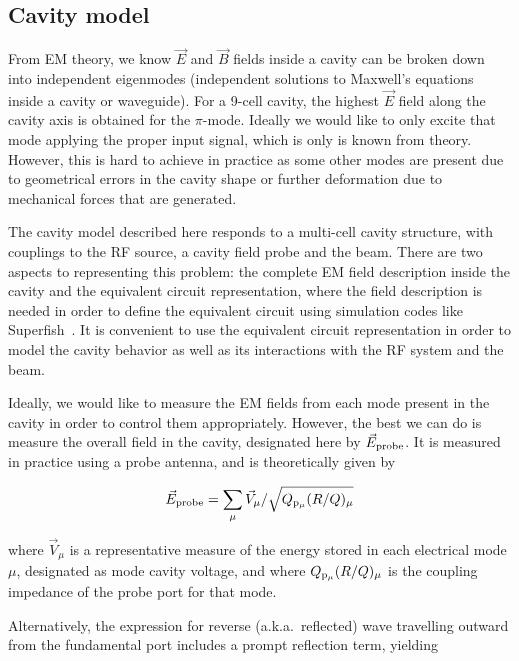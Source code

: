 \documentclass[a4paper,12pt]{article}
\begin{document}
\subsection{Cavity model}

From EM theory, we know $\vec{E}$ and $\vec{B}$ fields inside a cavity can be broken down into independent eigenmodes (independent solutions to Maxwell's equations inside a cavity or waveguide). For a 9-cell cavity, the highest $\vec{E}$ field along the cavity axis is obtained for the $\pi$-mode. Ideally we would like to only excite that mode applying the proper input signal, which is only is known from theory. However, this is hard to achieve in practice as some other modes are present due to geometrical errors in the cavity shape or further deformation due to mechanical forces that are generated.

The cavity model described here responds to a multi-cell cavity structure, with couplings to the RF source, a cavity field probe and the beam. There are two aspects to representing this problem: the complete EM field description inside the cavity and the equivalent circuit representation, where the field description is needed in order to define the equivalent circuit using simulation codes like Superfish~\cite{ref:superfish}. It is convenient to use the equivalent circuit representation in order to model the cavity behavior as well as its interactions with the RF system and the beam.

Ideally, we would like to measure the EM fields from each mode present in the cavity in order to control them appropriately. However, the best  we can do is measure the overall field in the cavity, designated here by $\vec E_{\rm probe}$. It is measured in practice using a probe antenna, and is theoretically given by

\begin{equation}
  \vec E_{\rm probe} = \sum_{\mu} \vec{V}_{\mu} /\sqrt{Q_{\rm p_{\mu}}(R/Q)_{\mu}}
  \label{eq:E_probe}
\end{equation}

\noindent where $\vec{V}_{\mu}$ is a representative measure of the energy stored in each electrical mode $\mu$, designated as mode cavity voltage, and where $Q_{\rm p_{\mu}}(R/Q)_{\mu}$ is the coupling impedance of the probe port for that mode.

Alternatively, the expression for reverse (a.k.a.~reflected) wave travelling outward from the fundamental port includes a prompt reflection term, yielding
\end{document}
